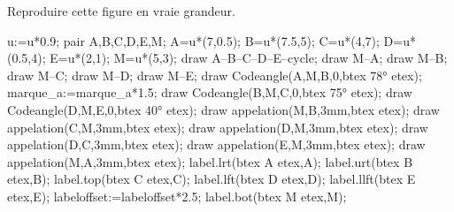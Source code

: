 
\begin{exercice*}
    Reproduire cette figure en vraie grandeur.

    \begin{Geometrie}
        u:=u*0.9;        
        pair A,B,C,D,E,M;
        A=u*(7,0.5);
        B=u*(7.5,5);
        C=u*(4,7);
        D=u*(0.5,4);
        E=u*(2,1);
        M=u*(5,3);
        draw A--B--C--D--E--cycle;
        draw M--A;
        draw M--B;
        draw M--C;
        draw M--D;
        draw M--E;
        draw Codeangle(A,M,B,0,btex \ang{78} etex);
        marque_a:=marque_a*1.5;
        draw Codeangle(B,M,C,0,btex \ang{75} etex);
        draw Codeangle(D,M,E,0,btex \ang{40} etex);
        draw appelation(M,B,3mm,btex  etex);
        draw appelation(C,M,3mm,btex  etex);
        draw appelation(D,M,3mm,btex  etex);
        draw appelation(D,C,3mm,btex  etex);
        draw appelation(E,M,3mm,btex  etex);
        draw appelation(M,A,3mm,btex  etex);
        label.lrt(btex A etex,A);
        label.urt(btex B etex,B);
        label.top(btex C etex,C);
        label.lft(btex D etex,D);
        label.llft(btex E etex,E);
        labeloffset:=labeloffset*2.5;
        label.bot(btex M etex,M);
    \end{Geometrie}
\end{exercice*}
